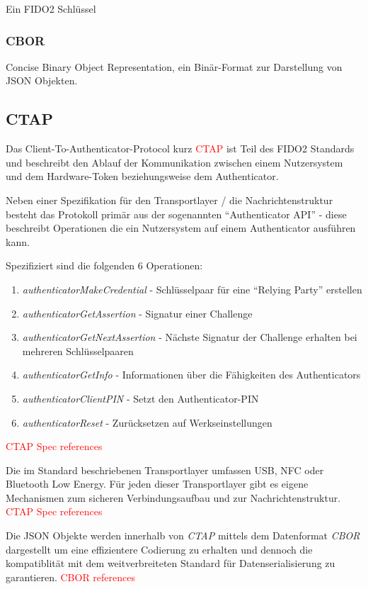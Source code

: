 \documentclass[journal]{IEEEtran}
\begin{document}
Ein FIDO2 Schlüssel

\subsubsection{CBOR}

Concise Binary Object Representation, ein Binär-Format zur Darstellung von JSON Objekten.

\subsection{CTAP}

Das Client-To-Authenticator-Protocol kurz \textcolor{red}{CTAP} ist Teil
des FIDO2 Standards und beschreibt den Ablauf der Kommunikation zwischen einem
Nutzersystem und dem Hardware-Token beziehungsweise dem Authenticator.

Neben einer Spezifikation für den Transportlayer / die Nachrichtenstruktur
besteht das Protokoll primär aus der sogenannten ``Authenticator API'' - diese
beschreibt Operationen die ein Nutzersystem auf einem Authenticator ausführen kann.

Spezifiziert sind die folgenden 6 Operationen:

\begin{enumerate}
	\item \textit{authenticatorMakeCredential} - Schlüsselpaar für eine
		``Relying Party'' erstellen
	\item \textit{authenticatorGetAssertion} - Signatur einer Challenge
	\item \textit{authenticatorGetNextAssertion} - Nächste Signatur der
		Challenge erhalten bei mehreren Schlüsselpaaren
	\item \textit{authenticatorGetInfo} - Informationen über die Fähigkeiten
		des Authenticators
	\item \textit{authenticatorClientPIN} - Setzt den Authenticator-PIN
	\item \textit{authenticatorReset} - Zurücksetzen auf Werkseinstellungen
\end{enumerate}

\textcolor{red}{CTAP Spec references}

Die im Standard beschriebenen Transportlayer umfassen USB, NFC oder Bluetooth
Low Energy. Für jeden dieser Transportlayer gibt es eigene Mechanismen zum
sicheren Verbindungsaufbau und zur Nachrichtenstruktur.
\textcolor{red}{CTAP Spec references}

Die JSON Objekte werden innerhalb von \textit{CTAP} mittels dem Datenformat
\textit{CBOR} dargestellt um eine effizientere Codierung zu erhalten und
dennoch die kompatiblität mit dem weitverbreiteten Standard für
Datenserialisierung zu garantieren.
\textcolor{red}{CBOR references}
\end{document}
